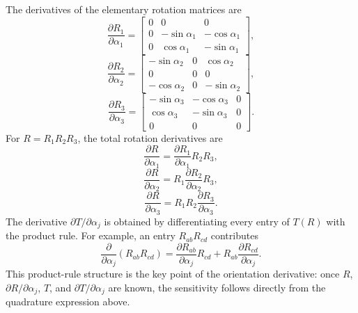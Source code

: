 The derivatives of the elementary rotation matrices are
\[
\frac{\partial R_1}{\partial \alpha_1}
=
\begin{bmatrix}
0 & 0 & 0\\
0 & -\sin\alpha_1 & -\cos\alpha_1\\
0 & \cos\alpha_1 & -\sin\alpha_1
\end{bmatrix},
\]
\[
\frac{\partial R_2}{\partial \alpha_2}
=
\begin{bmatrix}
-\sin\alpha_2 & 0 & \cos\alpha_2\\
0 & 0 & 0\\
-\cos\alpha_2 & 0 & -\sin\alpha_2
\end{bmatrix},
\]
\[
\frac{\partial R_3}{\partial \alpha_3}
=
\begin{bmatrix}
-\sin\alpha_3 & -\cos\alpha_3 & 0\\
\cos\alpha_3 & -\sin\alpha_3 & 0\\
0 & 0 & 0
\end{bmatrix}.
\]
For \(R=R_1R_2R_3\), the total rotation derivatives are
\[
\frac{\partial R}{\partial \alpha_1}
=
\frac{\partial R_1}{\partial \alpha_1}R_2R_3,
\]
\[
\frac{\partial R}{\partial \alpha_2}
=
R_1\frac{\partial R_2}{\partial \alpha_2}R_3,
\]
\[
\frac{\partial R}{\partial \alpha_3}
=
R_1R_2\frac{\partial R_3}{\partial \alpha_3}.
\]
The derivative \(\partial T/\partial\alpha_j\) is obtained by differentiating every entry of \(T(R)\) with the product rule. For example, an entry \(R_{a b}R_{c d}\) contributes
\[
\frac{\partial}{\partial\alpha_j}
\left(R_{a b}R_{c d}\right)
=
\frac{\partial R_{a b}}{\partial\alpha_j}R_{c d}
+
R_{a b}\frac{\partial R_{c d}}{\partial\alpha_j}.
\]
This product-rule structure is the key point of the orientation derivative: once \(R\), \(\partial R/\partial\alpha_j\), \(T\), and \(\partial T/\partial\alpha_j\) are known, the sensitivity follows directly from the quadrature expression above.
